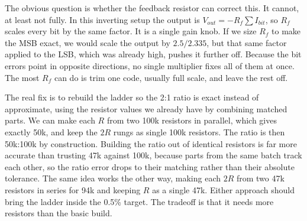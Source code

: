 \documentclass[11pt]{article}
\begin{document}
The obvious question is whether the feedback resistor can correct this. It cannot, at least not fully. In this inverting setup the output is $V_{out} = -R_f \sum I_{bit}$, so $R_f$ scales every bit by the same factor. It is a single gain knob. If we size $R_f$ to make the MSB exact, we would scale the output by $2.5/2.335$, but that same factor applied to the LSB, which was already high, pushes it further off. Because the bit errors point in opposite directions, no single multiplier fixes all of them at once. The most $R_f$ can do is trim one code, usually full scale, and leave the rest off.
 
The real fix is to rebuild the ladder so the 2:1 ratio is exact instead of approximate, using the resistor values we already have by combining matched parts. We can make each $R$ from two 100k resistors in parallel, which gives exactly 50k, and keep the $2R$ rungs as single 100k resistors. The ratio is then 50k:100k by construction. Building the ratio out of identical resistors is far more accurate than trusting 47k against 100k, because parts from the same batch track each other, so the ratio error drops to their matching rather than their absolute tolerance. The same idea works the other way, making each $2R$ from two 47k resistors in series for 94k and keeping $R$ as a single 47k. Either approach should bring the ladder inside the 0.5\% target. The tradeoff is that it needs more resistors than the basic build.

\end{document}
